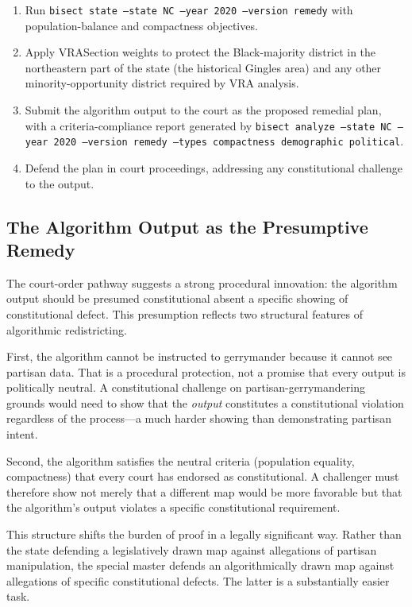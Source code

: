 \begin{enumerate}
  \item Run \texttt{bisect state --state NC --year 2020 --version remedy}
    with population-balance and compactness objectives.
  \item Apply VRASection weights to protect the Black-majority district
    in the northeastern part of the state (the historical Gingles area)
    and any other minority-opportunity district required by VRA analysis.
  \item Submit the algorithm output to the court as the proposed remedial
    plan, with a criteria-compliance report generated by
    \texttt{bisect analyze --state NC --year 2020 --version remedy
    --types compactness demographic political}.
  \item Defend the plan in court proceedings, addressing any constitutional
    challenge to the output.
\end{enumerate}

\subsection{The Algorithm Output as the Presumptive Remedy}

The court-order pathway suggests a strong procedural innovation: the algorithm
output should be presumed constitutional absent a specific showing of
constitutional defect.  This presumption reflects two structural features
of algorithmic redistricting.

First, the algorithm cannot be instructed to gerrymander because it cannot see partisan data. That is a procedural protection, not a promise that every output is politically neutral.
A constitutional challenge on partisan-gerrymandering grounds would need to
show that the \emph{output} constitutes a constitutional violation regardless
of the process---a much harder showing than demonstrating partisan intent.

Second, the algorithm satisfies the neutral criteria (population equality,
compactness) that every court has endorsed as constitutional.  A challenger
must therefore show not merely that a different map would be more favorable
but that the algorithm's output violates a specific constitutional requirement.

This structure shifts the burden of proof in a legally significant way.
Rather than the state defending a legislatively drawn map against allegations
of partisan manipulation, the special master defends an algorithmically drawn
map against allegations of specific constitutional defects.  The latter is a
substantially easier task.

